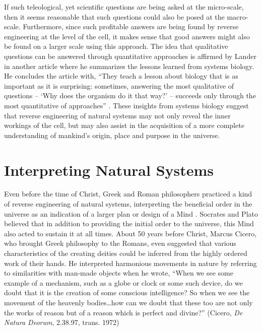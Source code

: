 If such teleological, yet scientific questions are being asked at the
micro-scale, then it seems reasonable that such questions could also be
posed at the macro-scale. Furthermore, since such profitable answers
are being found by reverse engineering at the level of the cell, it
makes sense that good answers might also be found on a larger scale
using this approach. The idea that qualitative questions can be
answered through quantitative approaches is affirmed by Lander in
another article where he summarizes the lessons learned from systems
biology. He concludes the article with, ``They teach a lesson about
biology that is as important as it is surprising: sometimes, answering
the most qualitative of questions – `Why does the organism do it that
way?' – succeeds only through the most quantitative of
approaches'' \citep{lander2007}. These insights from systems biology
suggest that reverse engineering of natural systems may not only reveal
the inner workings of the cell, but may also assist in the acquisition
of a more complete understanding of mankind’s origin, place and purpose
in the universe.

\section{Interpreting Natural Systems}

Even before the time of Christ, Greek and Roman philosophers practiced a
kind of reverse engineering of natural systems, interpreting the
beneficial order in the universe as an indication of a larger plan or
design of a Mind \citep{sedley2009}. Socrates and Plato believed that
in addition to providing the initial order to the universe, this Mind
also acted to sustain it at all times. About 50 years before Christ,
Marcus Cicero, who brought Greek philosophy to the Romans, even
suggested that various characteristics of the creating deities could be
inferred from the highly ordered work of their hands. He interpreted
harmonious movements in nature by referring to similarities with
man-made objects when he wrote, “When we see some example of a
mechanism, such as a globe or clock or some such device, do we doubt
that it is the creation of some conscious intelligence? So when we see
the movement of the heavenly bodies…how can we doubt that these too are
not only the works of reason but of a reason which is perfect and
divine?” (Cicero, \textit{De Natura Deorum}, 2.38.97, trans. 1972) %

